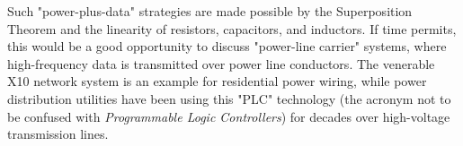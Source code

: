 





Such "power-plus-data" strategies are made possible by the Superposition Theorem and the linearity of resistors, capacitors, and inductors.  If time permits, this would be a good opportunity to discuss "power-line carrier" systems, where high-frequency data is transmitted over power line conductors.  The venerable X10 network system is an example for residential power wiring, while power distribution utilities have been using this "PLC" technology (the acronym not to be confused with {\it Programmable Logic Controllers}) for decades over high-voltage transmission lines.





